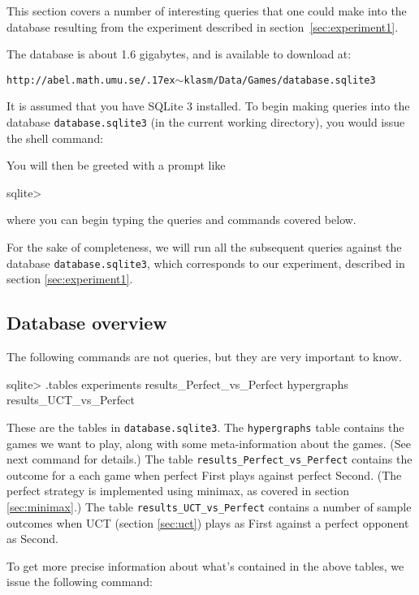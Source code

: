 This section covers a number of interesting queries that one could make into the database resulting from the experiment described in section~\ref{sec:experiment1}.

The database is about 1.6 gigabytes, and is available to download at:

\texttt{http://abel.math.umu.se/{\raise.17ex\hbox{$\scriptstyle\sim$}}klasm/Data/Games/database.sqlite3}

It is assumed that you have SQLite 3 installed.
To begin making queries into the database \texttt{database.sqlite3} (in the current working directory), you would issue the shell command:
You will then be greeted with a prompt like
\begin{code}
sqlite> 
\end{code}
where you can begin typing the queries and commands covered below.

For the sake of completeness, we will run all the subsequent queries against the database \texttt{database.sqlite3}, which corresponds to our experiment, described in section \ref{sec:experiment1}.

\subsection{Database overview}

The following commands are not queries, but they are very important to know.
\begin{code}
sqlite> .tables
experiments                 results_Perfect_vs_Perfect
hypergraphs                 results_UCT_vs_Perfect  
\end{code}
These are the tables in \texttt{database.sqlite3}. The \texttt{hypergraphs} table contains the games we want to play, along with some meta-information about the games. (See next command for details.)
The table \texttt{results\_Perfect\_vs\_Perfect} contains the outcome for a each game when perfect First plays against perfect Second. (The perfect strategy is implemented using minimax, as covered in section \ref{sec:minimax}.)
The table \texttt{results\_UCT\_vs\_Perfect} contains a number of sample outcomes when UCT (section \ref{sec:uct}) plays as First against a perfect opponent as Second.

To get more precise information about what's contained in the above tables, we issue the following command:

